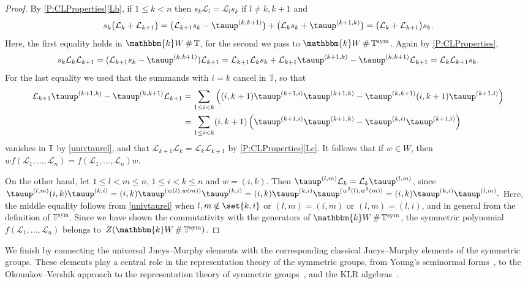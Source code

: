 \documentclass[a4paper,11pt]{amsart}
\numberwithin{equation}{subsection}
\theoremstyle{definition}
\theoremstyle{theorem}
\theoremstyle{remark}
\newcommand\CL{\mathcal{L}}
\newcommand\Sym{W}
\newcommand\op{\operatorname}
\newcommand{\ttau}{\tauup}
\newcommand\kk{\mathbbm{k}}
\newcommand\Tos{\mathbb{T}}
\newcommand\Tosym{\mathbb{T}^{\op{sym}}}
\DeclareMathOperator\Smash{\#}
\begin{document}
  \begin{proof}
     By \autoref{P:CLProperties}\autoref{Lb}, if $1\le k<n$ then
     $s_k\CL_l=\CL_ls_k$ if $l\ne k,k+1$ and
     \[
        s_k\bigl(\CL_k+\CL_{k+1}\bigr)
               =\bigl(\CL_{k+1}s_k-\ttau^{(k,k+1)}\bigr)
                   +\bigl(\CL_{k}s_k+\ttau^{(k+1,k)}\bigr)
               =\bigl(\CL_k+\CL_{k+1}\bigr)s_k.
     \]
     Here, the first equality holds in $\kk\Sym\Smash\Tos$, for the second we pass to  $\kk\Sym\Smash\Tosym$.
     Again by \autoref{P:CLProperties}, \[s_k\CL_k\CL_{k+1}=(\CL_{k+1}s_k-\ttau^{(k,k+1)})\CL_{k+1}
     =\CL_{k+1}\CL_{k}s_k+\CL_{k+1}\ttau^{(k+1,k)}-\ttau^{(k,k+1)}\CL_{k+1}=\CL_{k}\CL_{k+1}s_k.
     \]
For the last equality we used that the summands with $i=k$ cancel in $\Tos$, so that
\begin{align*}
\CL_{k+1}\ttau^{(k+1,k)}-\ttau^{(k,k+1)}\CL_{k+1}
    & =\sum_{1\leq i <k}\left((i,k+1)\ttau^{(k+1,i)}\ttau^{(k+1,k)}-\ttau^{(k,k+1)}(i,k+1)\ttau^{(k+1,i)}\right)\\
    &=\sum_{1\leq i <k} (i,k+1)\left(\ttau^{(k+1,i)}\ttau^{(k+1,k)}-\ttau^{(k,i)}\ttau^{(k+1,i)}\right)
\end{align*}
vanishes in $\Tos$ by \autoref{univtaurel}, and  that $\CL_{k+1}\CL_{k}=\CL_{k}\CL_{k+1}$ by  \autoref{P:CLProperties}\autoref{Lc}. It follows that
     if $w\in\Sym$, then $wf(\CL_1,\dots,\CL_n)=f(\CL_1,\dots,\CL_n)w$.

     On the other hand, let $1\le l<m\le n$, $1\le i<k\le n$ and  $w=(i,k)$.  Then $\ttau^{(l,m)}\CL_k=\CL_k\ttau^{(l,m)}$, since
   $\ttau^{(l,m)}(i,k)\ttau^{(k,i)}
               =(i,k)\ttau^{(w(l),w(m))}\ttau^{(k,i)}
               =(i,k)\ttau^{(k,i)}\ttau^{(w^2(l),w^2(m))}
               =(i,k)\ttau^{(k,i)}\ttau^{(l,m)}.$
  Here, the middle equality follows from \autoref{univtaurel} when
  $l,m\notin\set{k,i}$ or  $(l,m)=(i,m)$ or $(l,m)=(l,i)$, and in
  general from the definition of $\Tosym$.   Since we have shown the commutativity with the generators of $\kk\Sym\Smash\Tosym$, the symmetric polynomial $f(\CL_1,\dots,\CL_n)$ belongs
     to~$Z(\kk\Sym\Smash\Tosym)$.
  \end{proof}


We finish by connecting the universal Jucys--Murphy elements with
the corresponding classical Jucys--Murphy elements of the symmetric groups. These elements play
a central role in the representation theory of the symmetric groups,
from Young's seminormal forms~\cite{QSAI}, to the Okounkov--Vershik approach
to the representation theory of symmetric groups~\cite[\S3]{VObook}, and
the KLR algebras~\cite{BK:GradedKL}.
\end{document}
